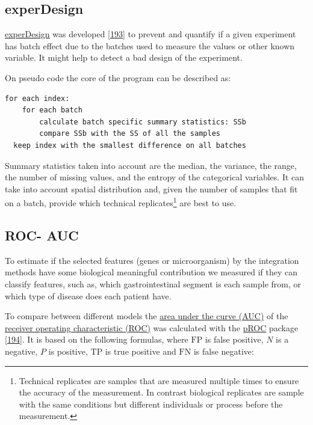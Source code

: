 \documentclass[
  12pt,
  a4paper,
  twoside,
  openright]{book}
\begin{document}
\hypertarget{experdesign}{%
\subsection{experDesign}\label{experdesign}}

\href{https://cran.r-project.org/package=experDesign}{experDesign} was developed {[}\protect\hyperlink{ref-revillasancho2021}{193}{]} to prevent and quantify if a given experiment has batch effect due to the batches used to measure the values or other known variable.
It might help to detect a bad design of the experiment.

On pseudo code the core of the program can be described as:

\hypertarget{pseudocode-experDesign}{%
\label{pseudocode-experDesign}}%
\begin{verbatim}
for each index:
    for each batch
        calculate batch specific summary statistics: SSb
        compare SSb with the SS of all the samples
  keep index with the smallest difference on all batches
\end{verbatim}

Summary statistics taken into account are the median, the variance, the range, the number of missing values, and the entropy of the categorical variables.
It can take into account spatial distribution and, given the number of samples that fit on a batch, provide which technical replicates\footnote{Technical replicates are samples that are measured multiple times to ensure the accuracy of the measurement.
  In contrast biological replicates are sample with the same conditions but different individuals or process before the measurement.} are best to use.

\hypertarget{ROC}{%
\subsection{ROC- AUC}\label{ROC}}

To estimate if the selected features (genes or microorganism) by the integration methods have some biological meaningful contribution we measured if they can classify features, such as, which gastrointestinal segment is each sample from, or which type of disease does each patient have.

To compare between different models the \protect\hyperlink{acronyms_AUC}{area under the curve (AUC)} of the \protect\hyperlink{acronyms_ROC}{receiver operating characteristic (ROC)} was calculated with the \href{https://cran.r-project.org/package=pROC}{pROC} package {[}\protect\hyperlink{ref-robin2011}{194}{]}.
It is based on the following formulas, where \(\text{FP}\) is false positive, \(N\) is a negative, \(P\) is positive, \(\text{TP}\) is true positive and \(\text{FN}\) is false negative:
\end{document}
